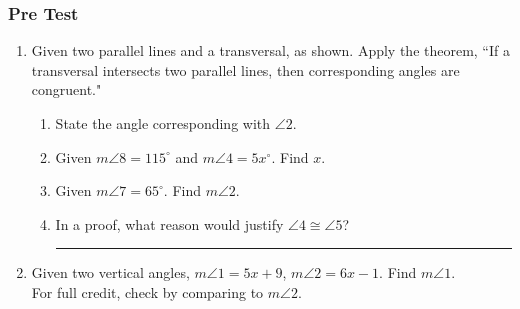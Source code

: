 \documentclass[12pt, twoside]{article}
\begin{document}
\subsubsection*{Pre Test}
  \begin{enumerate}

\item Given two parallel lines and a transversal, as shown. Apply the theorem, ``If a transversal intersects two parallel lines, then corresponding angles are congruent."
  \begin{center}
  \end{center}
  \begin{enumerate}
    \item State the angle corresponding with $\angle 2$. \vspace{1cm}
    \item Given $m\angle 8 = 115^\circ$ and $m\angle 4 = 5x^\circ$. Find $x$. \vspace{2cm}
    \item Given $m\angle 7 = 65^\circ$. Find $m\angle 2$. \vspace{2cm}
    \item In a proof, what reason would justify $\angle 4 \cong \angle 5$? \rule{6cm}{0.15mm}
  \end{enumerate}

  \item Given two vertical angles, $m \angle 1 = 5x+9$, $m \angle 2 = 6x-1$. Find $m \angle 1$.\\
  For full credit, check by comparing to $m\angle 2$.
      \begin{flushright}
      \end{flushright}


\end{enumerate}
\end{document}
